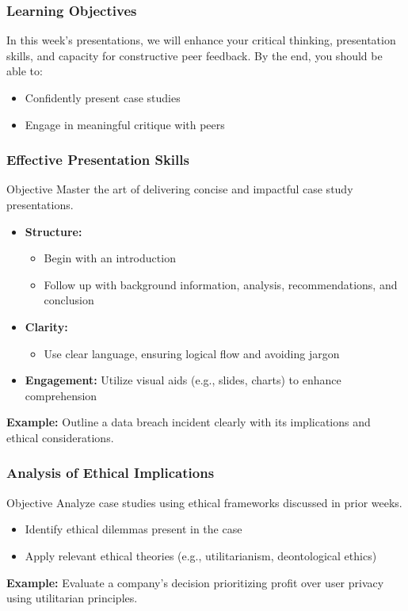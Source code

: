 \documentclass[aspectratio=169]{beamer}
\begin{document}
\begin{frame}[fragile]
    \frametitle{Learning Objectives}
    In this week’s presentations, we will enhance your critical thinking, presentation skills, and capacity for constructive peer feedback. By the end, you should be able to:
    \begin{itemize}
        \item Confidently present case studies
        \item Engage in meaningful critique with peers
    \end{itemize}
\end{frame}

\begin{frame}[fragile]
    \frametitle{Effective Presentation Skills}
    \begin{block}{Objective}
        Master the art of delivering concise and impactful case study presentations.
    \end{block}
    \begin{itemize}
        \item \textbf{Structure:} 
            \begin{itemize}
                \item Begin with an introduction
                \item Follow up with background information, analysis, recommendations, and conclusion
            \end{itemize}
        \item \textbf{Clarity:} 
            \begin{itemize}
                \item Use clear language, ensuring logical flow and avoiding jargon
            \end{itemize}
        \item \textbf{Engagement:} Utilize visual aids (e.g., slides, charts) to enhance comprehension
    \end{itemize}
    \textbf{Example:} Outline a data breach incident clearly with its implications and ethical considerations.
\end{frame}

\begin{frame}[fragile]
    \frametitle{Analysis of Ethical Implications}
    \begin{block}{Objective}
        Analyze case studies using ethical frameworks discussed in prior weeks.
    \end{block}
    \begin{itemize}
        \item Identify ethical dilemmas present in the case
        \item Apply relevant ethical theories (e.g., utilitarianism, deontological ethics)
    \end{itemize}
    \textbf{Example:} Evaluate a company’s decision prioritizing profit over user privacy using utilitarian principles.
\end{frame}
\end{document}
